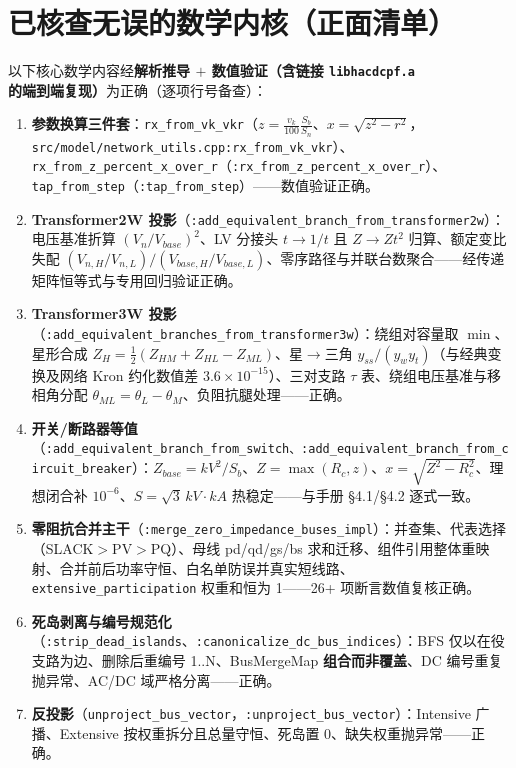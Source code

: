 \documentclass[11pt,a4paper,fontset=fandol]{ctexart}
\newcommand{\file}[1]{\texttt{#1}}
\begin{document}
\newpage
\section{已核查无误的数学内核（正面清单）}
\label{sec:verified}

以下核心数学内容经\textbf{解析推导 $+$ 数值验证（含链接 \file{libhacdcpf.a} 的端到端复现）}为正确（逐项行号备查）：

\begin{enumerate}
  \item \textbf{参数换算三件套}：\file{rx\_from\_vk\_vkr}（$z=\frac{v_k}{100}\frac{S_b}{S_n}$、$x=\sqrt{z^2-r^2}$，\file{src/model/network\_utils.cpp:rx\_from\_vk\_vkr}）、\file{rx\_from\_z\_percent\_x\_over\_r}（\file{:rx\_from\_z\_percent\_x\_over\_r}）、\file{tap\_from\_step}（\file{:tap\_from\_step}）——数值验证正确。
  \item \textbf{Transformer2W 投影}（\file{:add\_equivalent\_branch\_from\_transformer2w}）：电压基准折算 $(V_n/V_{base})^2$、LV 分接头 $t\to 1/t$ 且 $Z\to Zt^2$ 归算、额定变比失配 $(V_{n,H}/V_{n,L})/(V_{base,H}/V_{base,L})$、零序路径与并联台数聚合——经传递矩阵恒等式与专用回归验证正确。
  \item \textbf{Transformer3W 投影}（\file{:add\_equivalent\_branches\_from\_transformer3w}）：绕组对容量取 $\min$、星形合成 $Z_H=\frac{1}{2}(Z_{HM}+Z_{HL}-Z_{ML})$、星$\to$三角 $y_{ss}/(y_w y_t)$（与经典变换及网络 Kron 约化数值差 $3.6\times10^{-15}$）、三对支路 $\tau$ 表、绕组电压基准与移相角分配 $\theta_{ML}=\theta_L-\theta_M$、负阻抗腿处理——正确。
  \item \textbf{开关/断路器等值}（\file{:add\_equivalent\_branch\_from\_switch、:add\_equivalent\_branch\_from\_circuit\_breaker}）：$Z_{base}=kV^2/S_b$、$Z=\max(R_c,z)$、$x=\sqrt{Z^2-R_c^2}$、理想闭合补 $10^{-6}$、$S=\sqrt{3}\,kV\cdot kA$ 热稳定——与手册 \S 4.1/\S 4.2 逐式一致。
  \item \textbf{零阻抗合并主干}（\file{:merge\_zero\_impedance\_buses\_impl}）：并查集、代表选择（SLACK$>$PV$>$PQ）、母线 pd/qd/gs/bs 求和迁移、组件引用整体重映射、合并前后功率守恒、白名单防误并真实短线路、\texttt{extensive\_participation} 权重和恒为 1——26+ 项断言数值复核正确。
  \item \textbf{死岛剥离与编号规范化}（\file{:strip\_dead\_islands}、\file{:canonicalize\_dc\_bus\_indices}）：BFS 仅以在役支路为边、删除后重编号 1..N、BusMergeMap \textbf{组合而非覆盖}、DC 编号重复抛异常、AC/DC 域严格分离——正确。
  \item \textbf{反投影}（\file{unproject\_bus\_vector}，\file{:unproject\_bus\_vector}）：Intensive 广播、Extensive 按权重拆分且总量守恒、死岛置 0、缺失权重抛异常——正确。

\end{enumerate}
\end{document}
